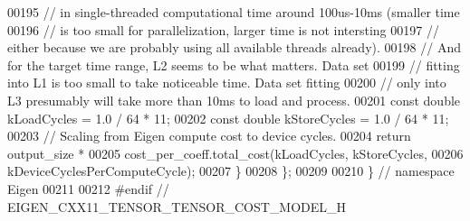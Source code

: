 \begin{DoxyCode}
00195     \textcolor{comment}{// in single-threaded computational time around 100us-10ms (smaller time}
00196     \textcolor{comment}{// is too small for parallelization, larger time is not intersting}
00197     \textcolor{comment}{// either because we are probably using all available threads already).}
00198     \textcolor{comment}{// And for the target time range, L2 seems to be what matters. Data set}
00199     \textcolor{comment}{// fitting into L1 is too small to take noticeable time. Data set fitting}
00200     \textcolor{comment}{// only into L3 presumably will take more than 10ms to load and process.}
00201     \textcolor{keyword}{const} \textcolor{keywordtype}{double} kLoadCycles = 1.0 / 64 * 11;
00202     \textcolor{keyword}{const} \textcolor{keywordtype}{double} kStoreCycles = 1.0 / 64 * 11;
00203     \textcolor{comment}{// Scaling from Eigen compute cost to device cycles.}
00204     \textcolor{keywordflow}{return} output\_size *
00205         cost\_per\_coeff.total\_cost(kLoadCycles, kStoreCycles,
00206                                   kDeviceCyclesPerComputeCycle);
00207   \}
00208 \};
00209 
00210 \}  \textcolor{comment}{// namespace Eigen}
00211 
00212 \textcolor{preprocessor}{#endif  // EIGEN\_CXX11\_TENSOR\_TENSOR\_COST\_MODEL\_H}
\end{DoxyCode}
